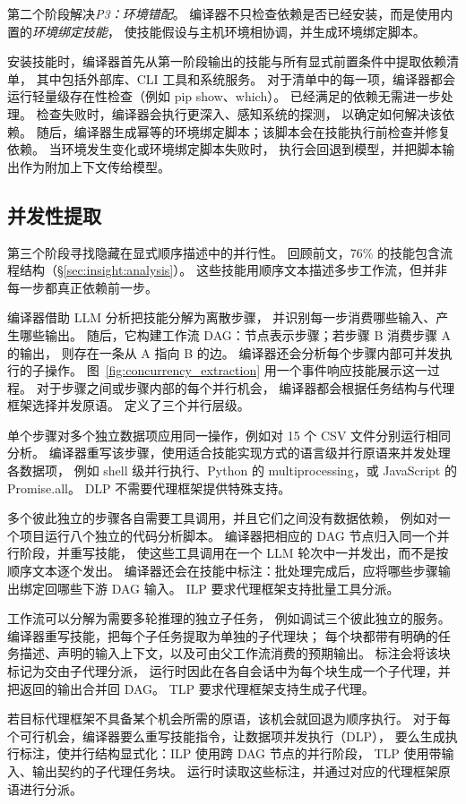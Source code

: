 第二个阶段解决\emph{P3：环境错配}。
编译器不只检查依赖是否已经安装，而是使用内置的\emph{环境绑定技能}，
使技能假设与主机环境相协调，并生成环境绑定脚本。

安装技能时，编译器首先从第一阶段输出的技能与所有显式前置条件中提取依赖清单，
其中包括外部库、CLI 工具和系统服务。
对于清单中的每一项，编译器都会运行轻量级存在性检查（例如 pip show、which）。
已经满足的依赖无需进一步处理。
检查失败时，编译器会执行更深入、感知系统的探测，
以确定如何解决该依赖。
随后，编译器生成幂等的环境绑定脚本；该脚本会在技能执行前检查并修复依赖。
当环境发生变化或环境绑定脚本失败时，
执行会回退到模型，并把脚本输出作为附加上下文传给模型。

\subsection{并发性提取}
\label{sec:compiler:par}

第三个阶段寻找隐藏在显式顺序描述中的并行性。
回顾前文，76\% 的技能包含流程结构（\S\ref{sec:insight:analysis}）。
这些技能用顺序文本描述多步工作流，但并非每一步都真正依赖前一步。

编译器借助 LLM 分析把技能分解为离散步骤，
并识别每一步消费哪些输入、产生哪些输出。
随后，它构建工作流 DAG：节点表示步骤；若步骤 B 消费步骤 A 的输出，
则存在一条从 A 指向 B 的边。
编译器还会分析每个步骤内部可并发执行的子操作。
图~\ref{fig:concurrency_extraction} 用一个事件响应技能展示这一过程。
对于步骤之间或步骤内部的每个并行机会，
编译器都会根据任务结构与代理框架选择并发原语。
\sys 定义了三个并行层级。

单个步骤对多个独立数据项应用同一操作，例如对 15 个 CSV 文件分别运行相同分析。
编译器重写该步骤，使用适合技能实现方式的语言级并行原语来并发处理各数据项，
例如 shell 级并行执行、Python 的 multiprocessing，或 JavaScript 的 Promise.all。
DLP 不需要代理框架提供特殊支持。

多个彼此独立的步骤各自需要工具调用，并且它们之间没有数据依赖，
例如对一个项目运行八个独立的代码分析脚本。
编译器把相应的 DAG 节点归入同一个并行阶段，并重写技能，
使这些工具调用在一个 LLM 轮次中一并发出，而不是按顺序文本逐个发出。
编译器还会在技能中标注：批处理完成后，应将哪些步骤输出绑定回哪些下游 DAG 输入。
ILP 要求代理框架支持批量工具分派。

工作流可以分解为需要多轮推理的独立子任务，
例如调试三个彼此独立的服务。
编译器重写技能，把每个子任务提取为单独的子代理块；
每个块都带有明确的任务描述、声明的输入上下文，以及可由父工作流消费的预期输出。
标注会将该块标记为交由子代理分派，
运行时因此在各自会话中为每个块生成一个子代理，并把返回的输出合并回 DAG。
TLP 要求代理框架支持生成子代理。

若目标代理框架不具备某个机会所需的原语，该机会就回退为顺序执行。
对于每个可行机会，编译器要么重写技能指令，让数据项并发执行（DLP），
要么生成执行标注，使并行结构显式化：ILP 使用跨 DAG 节点的并行阶段，
TLP 使用带输入、输出契约的子代理任务块。
运行时读取这些标注，并通过对应的代理框架原语进行分派。
